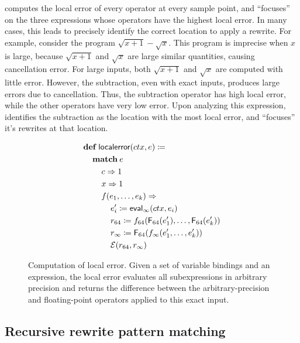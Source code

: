 \documentclass[paper.tex]{subfiles}
\begin{document}
\casio computes the local error of every operator at every sample point,
  and ``focuses'' on the three expressions
  whose operators have the highest local error.
In many cases, this leads \casio to precisely identify the correct location
  to apply a rewrite.
For example, consider the program $\sqrt{x+1} - \sqrt{x}$.
This program is imprecise when $x$ is large,
  because $\sqrt{x+1}$ and $\sqrt{x}$ are large similar quantities,
  causing cancellation error.
For large inputs, both $\sqrt{x+1}$ and $\sqrt{x}$
  are computed with little error.
However, the subtraction, even with exact inputs,
  produces large errors due to cancellation.
Thus, the subtraction operator has high local error,
  while the other operators have very low error.
Upon analyzing this expression, 
  \casio identifies the subtraction as the location with the most local error,
  and ``focuses'' it's rewrites at that location.

\begin{figure}
\begin{footnotesize}
\begin{align*}
  &\!def!\:\|localerror|(ctx, e) \ceq \\
  &\> \!match!\:e \\
  &\> \> c \tto 1 \\
  &\> \> x \tto 1 \\
  &\> \> f(e_1, \dotsc, e_k) \tto \\
  &\> \> \>  e_i' \ceq \|eval|_\infty(ctx, e_i) \\
  &\> \> \>  r_{64} \ceq f_{64}(\F_{64}(e_1'), \dotsc, \F_{64}(e_k')) \\
  &\> \> \>  r_\infty \ceq \F_{64}(f_\infty(e_1', \dotsc, e_k')) \\
  &\> \> \>  \Err(r_{64}, r_\infty) \\
\end{align*}
\end{footnotesize}
\caption{Computation of local error.
  Given a set of variable bindings and an expression,
  the local error evaluates all subexpressions in arbitrary precision and returns
  the difference between the arbitrary-precision and floating-point operators
  applied to this exact input.}
\label{alg:focus}
\end{figure}

\subsection{Recursive rewrite pattern matching}
\end{document}
